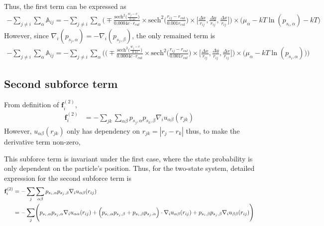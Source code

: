 \documentclass[11pt, oneside]{article}   	%
\begin{document}
Thus, the first term can be expressed as
\begin{align}
 - \sum_{j\neq i} \sum_{\alpha}  \mathbb{A}_{ij}= - \sum_{j \neq i} \sum_{\alpha} \Biggl(\mp\frac{\textrm{sech}^2 \bigl( \frac{w_j-c}{0.1c} \bigr)  }{0.0004c\cdot r_{cut}} \times \textrm{sech}^2 \bigl(\frac{r_{ij}-r_{cut}}{0.001r_{cut}}\bigr)  \times \Big[\frac{\Delta x}{r_{ij}}, \frac{\Delta y}{r_{ij}}, \frac{\Delta x}{r_{ij}}\Big] \Biggr) \times \bigl( \mu_{\alpha} - kT \ln(p_{s_i, \alpha}) -kT\bigr)
\end{align}
However, since $\nabla_i (p_{s_j,\alpha}) = -\nabla_i (p_{s_j,\beta}) $, the only remained term is
\begin{align}
- \sum_{j\neq i} \sum_{\alpha}  \mathbb{A}_{ij}= - \sum_{j \neq i} \sum_{\alpha} \Biggl( \bigl(\mp\frac{\textrm{sech}^2 \bigl( \frac{w_j-c}{0.1c} \bigr)  }{0.0004c\cdot r_{cut}} \times \textrm{sech}^2 \bigl(\frac{r_{ij}-r_{cut}}{0.001r_{cut}}\bigr)  \times \Big[\frac{\Delta x}{r_{ij}}, \frac{\Delta y}{r_{ij}}, \frac{\Delta x}{r_{ij}}\Big]\bigr)  \times \bigl( \mu_\alpha - kT \ln(p_{s_i, \alpha}) \bigr) \Biggr)
\end{align}
\subsection{Second subforce term}
From definition of $\mathbf{f}_i^{(2)}$, 
\begin{align*}
\mathbf{f}^{(2)}_i &= - \sum_{jk} \sum_{\alpha \beta} p_{s_j, \alpha} p_{s_k, \beta} \nabla_i u_{\alpha \beta} (r_{jk}) 
\end{align*}
However, $u_{\alpha \beta} (r_{jk})$ only has dependency on $r_{jk}=|r_j - r_k|$ thus, to make the derivative term non-zero, 

This subforce term is invariant under the first case, where the state probability is only dependent on the particle's position. Thus, for the two-state system, detailed expression for the second subforce term is
\begin{align}
\mathbf{f}^{(2)}_i &= - \sum_{j}\sum_{\alpha \beta} p_{s_i,\alpha} p_{s_j,\beta} \nabla_i u_{\alpha \beta} (r_{ij}) \\ \notag
&= -\sum_{j} \Biggl(  p_{s_i,\alpha} p_{s_j,\alpha} \nabla_i u_{\alpha \alpha} (r_{ij}) + \Bigl( p_{s_i,\alpha} p_{s_j,\beta} +  p_{s_i,\beta} p_{s_j,\alpha}\Bigr)\cdot\nabla_i u_{\alpha \beta} (r_{ij}) + p_{s_i,\beta} p_{s_j,\beta} \nabla_i u_{\beta \beta} (r_{ij}) \Biggr)
\end{align}
\end{document}
